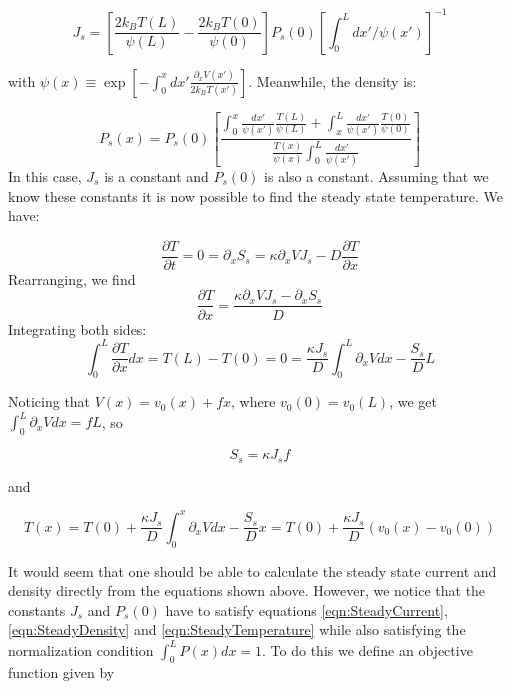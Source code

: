 \documentclass[11pt]{article} %
\begin{document}
\begin{equation}
J_s = \left [\frac{2 k_B T(L)}{\psi(L)} - \frac{2 k_B T(0)}{\psi(0)}  \right] P_s(0) \left [\int_0^L dx'/\psi(x') \right]^{-1}
\label{eqn:SteadyCurrent}
\end{equation}

with $\psi(x) \equiv \exp[-\int_0^x dx' \frac{\partial_x V(x')}{2 k_B T(x')}]$. Meanwhile, the density is:

\begin{equation}
P_s(x) = P_s(0) \left [\frac{\int_0^x \frac{dx'}{\psi(x')} \frac{T(L)}{\psi(L)} + \int_x^L \frac{dx'}{\psi(x')} \frac{T(0)}{\psi(0)} }{\frac{T(x)}{\psi(x)} \int_0^L \frac{dx'}{\psi(x')} } \right]
\label{eqn:SteadyDensity}
\end{equation}
In this case, $J_s$ is a constant and $P_s(0)$ is also a constant. Assuming that we know these constants it is now possible to find the steady state temperature. We have:

\begin{equation}
\frac{\partial T}{\partial t} = 0 =  \partial_x S_s = \kappa \partial_x V J_s - D \frac{\partial T}{\partial x}
\end{equation}
Rearranging, we find
\begin{equation}
\frac{\partial T}{\partial x} = \frac{\kappa \partial_x V J_s - \partial_x S_s}{D}
\end{equation}
Integrating both sides:
\begin{equation}
\int_0^L \frac{\partial T}{\partial x} dx = T(L) - T(0) = 0 = \frac{\kappa J_s}{D} \int_0^L \partial_x V dx - \frac{S_s}{D}L
\end{equation}

Noticing that $V(x) = v_0(x) + f x$, where $v_0(0) = v_0(L)$, we get $\int_0^L \partial_x V dx = f L$, so

\begin{equation}
S_s = \kappa J_s f
\end{equation}

and

\begin{equation}
T(x) = T(0) + \frac{\kappa J_s}{D} \int_0^x \partial_x V dx - \frac{S_s}{D}x = T(0) + \frac{\kappa J_s}{D} (v_0(x) - v_0(0)) \label{eqn:SteadyTemperature}
\end{equation}

It would seem that one should be able to calculate the steady state current and density directly from the equations shown above. However, we notice that the constants $J_s$ and $P_s(0)$ have to satisfy equations \ref{eqn:SteadyCurrent}, \ref{eqn:SteadyDensity} and \ref{eqn:SteadyTemperature} while also satisfying the normalization condition $\int_0^L P(x) dx = 1$. To do this we define an objective function given by
\end{document}
